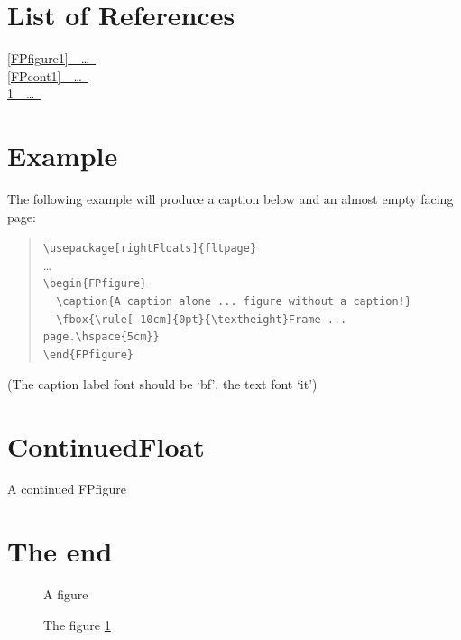 \captionsetup[FPfigure]{labelfont=bf}
\renewcommand\theContinuedFloat{\alph{ContinuedFloat}}



\listoffigures

\section*{List of References}
\hyperref[FPfigure1]{\ref*{FPfigure1}~~\ldots~\pageref*{FPfigure1}}\\
\hyperref[FPcont1]{\ref*{FPcont1}~~\ldots~\pageref*{FPcont1}}\\
\hyperref[figure1]{\ref*{figure1}~~\ldots~\pageref*{figure1}}

\section{Example}
The following example will produce a caption below and an almost empty facing
page:
\begin{FPfigure}
 \captionsetup{textfont=it}
 \caption[A caption alone on a page (\ref*{FPfigure1})]%
         {A caption alone on a page will belong to the
          following figure without a caption!}
 \label{FPfigure1}
 \newlength\tempdima
 \setlength\tempdima\textheight
 \addtolength\tempdima{-7pt}%
\end{FPfigure}
\begin{quote}
  \verb|\usepackage[rightFloats]{fltpage}|\\
  \ldots\\
  \verb|\begin{FPfigure}|\\
  \verb|  \caption{A caption alone ... figure without a caption!}|\\
  \verb|  \fbox{\rule[-10cm]{0pt}{\textheight}Frame ... page.\hspace{5cm}}|\\
  \verb|\end{FPfigure}|
\end{quote}

\par\bigskip\noindent
(The caption label font should be `bf', the text font `it')

\clearpage
\section{ContinuedFloat}
\captionsetup[ContinuedFloat]{textfont=it}

\begin{FPfigure}
\ContinuedFloat
 \centering A continued FPfigure
 \caption{The continued FPfigure \ref*{FPcont1}}
 \label{FPcont1}
\end{FPfigure}

\clearpage
\section{The end}

\begin{figure}[!ht]
 \centering A figure
 \caption{The figure \ref*{figure1}}
 \label{figure1}
\end{figure}


